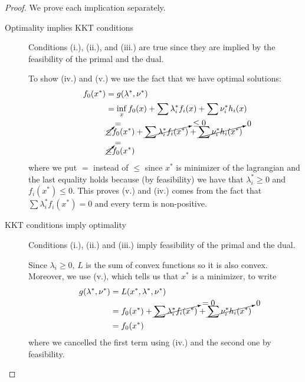 \documentclass[12pt]{extarticle}
\begin{document}
\begin{proof}
	We prove each implication separately.
	\begin{description}
		\item[Optimality implies KKT conditions]
		      Conditions (i.), (ii.), and (iii.) are true since they are implied
		      by the feasibility of the primal and the dual.

		      To show (iv.) and (v.) we use the fact that we have optimal solutions:
		      \begin{align}
			      f_0(x^*) & = g(\lambda^*, \nu^*)                                                                                            \\
			               & = \inf_{x} f_0(x) + \sum \lambda_i^* f_i(x) + \sum \nu_i^* h_i(x)                                                \\
			               & \cancelto{=}{\leq} f_0(x^*) + \cancelto{\leq 0}{\sum \lambda_i^* f_i(x^*)} + \cancelto{0}{\sum \nu_i^* h_i(x^*)} \\
			               & \cancelto{=}{\leq} f_0(x^*)
		      \end{align}
		      where we put $=$ instead of $\leq$ since $x^*$ is minimizer of the lagrangian and
		      the last equality holds because (by feasibility) we have that $\lambda_i^* \geq 0$
		      and $f_i(x^*) \leq 0$.
		      This proves (v.) and (iv.) comes from the fact that $\sum \lambda_i^* f_i(x^*) = 0$
		      and every term is non-positive.
		\item[KKT conditions imply optimality]
		      Conditions (i.), (ii.) and (iii.) imply feasibility of the primal and the dual.

		      Since $\lambda_i \geq 0$, $L$ is the sum of convex functions so it is also convex.
		      Moreover, we use (v.), which tells us that $x^*$ is a minimizer, to write
		      \begin{align}
			      g(\lambda^*, \nu^*) & = L(x^*, \lambda^*, \nu^*)                                                                   \\
			                          & = f_0(x^*) + \cancelto{= 0}{\sum \lambda_i^* f_i(x^*)} + \cancelto{0}{\sum \nu_i^* h_i(x^*)} \\
			                          & = f_0(x^*)
		      \end{align}
		      where we cancelled the first term using (iv.) and the second one by feasibility.
		      \qedhere
	\end{description}
\end{proof}
\end{document}
